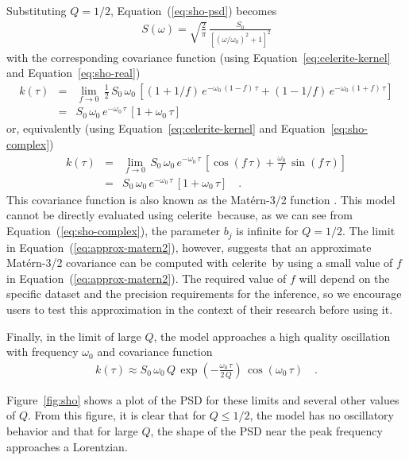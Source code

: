 \documentclass[manuscript, letterpaper]{aastex6}
\newcommand{\project}[1]{\textsf{#1}}
\newcommand{\celerite}{\project{celerite}}
\newcommand{\figureref}[1]{\ref{fig:#1}}
\newcommand{\Figure}[1]{Figure~\figureref{#1}}
\renewcommand{\eqref}[1]{\ref{eq:#1}}
\newcommand{\Eq}[1]{Equation~(\eqref{#1})}
\newcommand{\eq}[1]{\Eq{#1}}
\newcommand{\eqalt}[1]{Equation~\eqref{#1}}
\newcommand{\eqlabel}[1]{\label{eq:#1}}
\newcommand{\response}[1]{{#1}}
\begin{document}
\begin{itemize}
          {\item Substituting $Q = 1/2$, \eq{sho-psd} becomes
          \begin{eqnarray}
              S(\omega) =
              \sqrt{\frac{2}{\pi}}\,\frac{S_0}{\left[(\omega/\omega_0)^2+1\right]^2}
          \end{eqnarray}
          with the corresponding covariance function (using
          \eqalt{celerite-kernel} and \eqalt{sho-real})
          \begin{eqnarray}\eqlabel{approx-matern}
              k(\tau) &=& \lim_{f \to 0}\,
              \frac{1}{2}\,S_0\,\omega_0\,
              \left[\left(1+1/f\right)\,e^{-\omega_0\,(1-f)\,\tau} +
              \left(1-1/f\right)\,e^{-\omega_0\,(1+f)\,\tau}
              \right] \\
              &=& S_0\,\omega_0\,e^{-\omega_0\,\tau}\,[1+\omega_0\,\tau]
          \end{eqnarray}
          or, equivalently (using \eqalt{celerite-kernel} and \eqalt{sho-complex})
          \begin{eqnarray}\eqlabel{approx-matern2}
              k(\tau) &=& \lim_{f \to 0}\,
              S_0\,\omega_0\,e^{-\omega_0\,\tau}\,
              \left[\cos(f\,\tau) + \frac{\omega_0}{f}\,\sin(f\,\tau)\right] \\
              &=& S_0\,\omega_0\,e^{-\omega_0\,\tau}\,[1+\omega_0\,\tau] \quad.
          \end{eqnarray}
          This covariance function is also known as the Mat\'ern-3/2 function
          \citep{Rasmussen:2006}.
          \response{This model cannot be directly evaluated using \celerite\ because,
              as we can see from \eq{sho-complex}, the parameter $b_j$ is infinite for $Q =
                  1/2$.
              The limit in \eq{approx-matern2}, however, suggests that an approximate
              Mat\'ern-3/2 covariance can be computed with \celerite\ by using a small value
              of $f$ in \eq{approx-matern2}.
              The required value of $f$ will depend on the specific dataset and the precision
              requirements for the inference, so we encourage users to test this
              approximation in the context of their research before using it.
          }}

          {\item Finally, in the limit of large $Q$, the model approaches a high
          quality oscillation with frequency $\omega_0$ and covariance function
          \begin{eqnarray}
              k(\tau) \approx
              S_0\,\omega_0\,Q\,
              \exp\left(-\frac{\omega_0\,\tau}{2\,Q}\right)\,
              \cos\left(\omega_0\,\tau\right) \quad.
          \end{eqnarray}}

\end{itemize}
\Figure{sho} shows a plot of the PSD for these limits and several other values
of $Q$.
From this figure, it is clear that for $Q \le 1/2$, the model has no
oscillatory behavior and that for large $Q$, the shape of the PSD near the
peak frequency approaches a Lorentzian.
\end{document}
